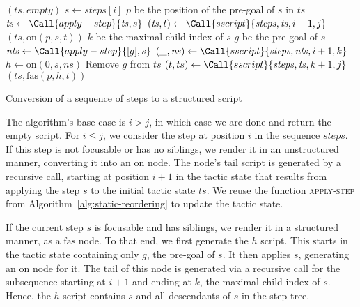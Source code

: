 \documentclass[sigplan,10pt,anonymous,review]{acmart}
\begin{document}
\begin{algorithm}
  \begin{algorithmic}
        \State \Return $(\mathit{ts}, \mathit{empty})$
      \EndIf
      \State $s \gets \mathit{steps}[i]$
      \State \Let $p$ be the position of the pre-goal of $s$ in $\mathit{ts}$
        \State $\mathit{ts} \gets \Call{apply-step}{\mathit{ts}, s}$
        \State $(\mathit{ts}, t) \gets \Call{sscript}{\mathit{steps}, \mathit{ts}, i+1, j}$
        \State \Return $(\mathit{ts}, \mathrm{on}(p, s, t))$
      \Else
        \State \Let $k$ be the maximal child index of $s$
        \State \Let $g$ be the pre-goal of $s$
        \State $\mathit{nts} \gets \Call{apply-step}{[g], s}$
        \State $(\_, \mathit{ns}) \gets \Call{sscript}{\mathit{steps}, \mathit{nts}, i+1, k}$
        \State $h \gets \mathrm{on}(0, s, \mathit{ns})$
        \State Remove $g$ from $ts$
        \State $(t, ts) \gets \Call{sscript}{\mathit{steps}, \mathit{ts}, k+1, j}$
        \State \Return $(\mathit{ts}, \mathrm{fas}(p, h, t))$
      \EndIf
    \EndFunction
  \end{algorithmic}
  \caption{Conversion of a sequence of steps to a structured script}%
  \label{alg:sscript}
\end{algorithm}

The algorithm's base case is $i > j$, in which case we are done and return the empty script.
For $i ≤ j$, we consider the step at position $i$ in the sequence $\mathit{steps}$.
If this step is not focusable or has no siblings, we render it in an unstructured manner, converting it into an $\mathrm{on}$ node.
The node's tail script is generated by a recursive call, starting at position $i + 1$ in the tactic state that results from applying the step $s$ to the initial tactic state $\mathit{ts}$.
We reuse the function \textsc{apply-step} from Algorithm~\ref{alg:static-reordering} to update the tactic state.

If the current step $s$ is focusable and has siblings, we render it in a structured manner, as a $\mathrm{fas}$ node.
To that end, we first generate the $h$ script.
This starts in the tactic state containing only $g$, the pre-goal of $s$.
It then applies $s$, generating an $\mathrm{on}$ node for it.
The tail of this node is generated via a recursive call for the subsequence starting at $i + 1$ and ending at $k$, the maximal child index of $s$.
Hence, the $h$ script contains $s$ and all descendants of $s$ in the step tree.
\end{document}
